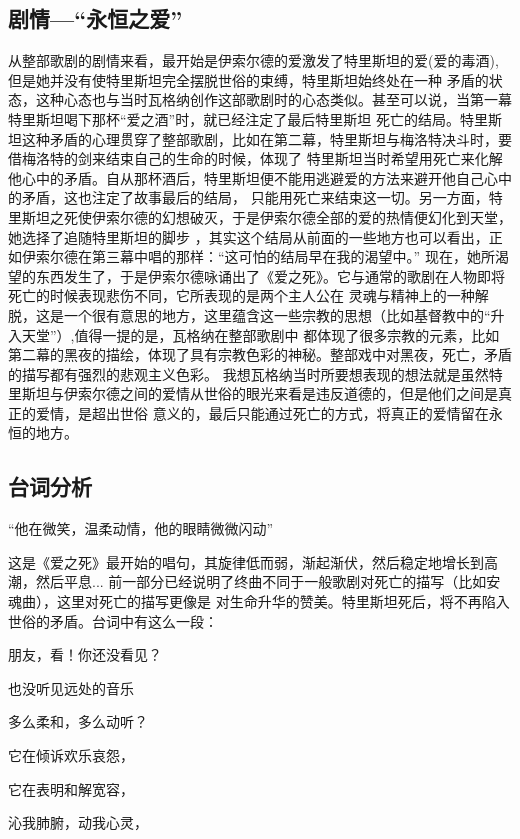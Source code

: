\documentclass[10pt,a4paper]{ctexart}
\newcommand{\upcite}[1]{\textsuperscript{\textsuperscript{\cite{#1}}}}
\begin{document}
    \subsection*{剧情—“永恒之爱”}
    从整部歌剧的剧情来看，最开始是伊索尔德的爱激发了特里斯坦的爱(爱的毒酒),但是她并没有使特里斯坦完全摆脱世俗的束缚，特里斯坦始终处在一种
    矛盾的状态，这种心态也与当时瓦格纳创作这部歌剧时的心态类似。甚至可以说，当第一幕特里斯坦喝下那杯“爱之酒”时，就已经注定了最后特里斯坦
    死亡的结局。特里斯坦这种矛盾的心理贯穿了整部歌剧，比如在第二幕，特里斯坦与梅洛特决斗时，要借梅洛特的剑来结束自己的生命的时候，体现了
    特里斯坦当时希望用死亡来化解他心中的矛盾。自从那杯酒后，特里斯坦便不能用逃避爱的方法来避开他自己心中的矛盾，这也注定了故事最后的结局，
    只能用死亡来结束这一切。另一方面，特里斯坦之死使伊索尔德的幻想破灭，于是伊索尔德全部的爱的热情便幻化到天堂，她选择了追随特里斯坦的脚步
    ，其实这个结局从前面的一些地方也可以看出，正如伊索尔德在第三幕中唱的那样：“这可怕的结局早在我的渴望中。”\upcite{生与悲的爱情}
    现在，她所渴望的东西发生了，于是伊索尔德咏诵出了《爱之死》。它与通常的歌剧在人物即将死亡的时候表现悲伤不同，它所表现的是两个主人公在
    灵魂与精神上的一种解脱，这是一个很有意思的地方，这里蕴含这一些宗教的思想（比如基督教中的“升入天堂”）,值得一提的是，瓦格纳在整部歌剧中
    都体现了很多宗教的元素，比如第二幕的黑夜的描绘，体现了具有宗教色彩的神秘。整部戏中对黑夜，死亡，矛盾的描写都有强烈的悲观主义色彩。
    我想瓦格纳当时所要想表现的想法就是虽然特里斯坦与伊索尔德之间的爱情从世俗的眼光来看是违反道德的，但是他们之间是真正的爱情，是超出世俗
    意义的，最后只能通过死亡的方式，将真正的爱情留在永恒的地方。
    \subsection*{台词分析}
    “他在微笑，温柔动情，他的眼睛微微闪动”\upcite{西洋著名歌剧剧作集1}

    这是《爱之死》最开始的唱句，其旋律低而弱，渐起渐伏，然后稳定地增长到高潮，然后平息...
    前一部分已经说明了终曲不同于一般歌剧对死亡的描写（比如安魂曲），这里对死亡的描写更像是
    对生命升华的赞美。特里斯坦死后，将不再陷入世俗的矛盾。台词中有这么一段：

    朋友，看！你还没看见？

    也没听见远处的音乐

    多么柔和，多么动听？

    它在倾诉欢乐哀怨，

    它在表明和解宽容，

    沁我肺腑，动我心灵，
\end{document}
